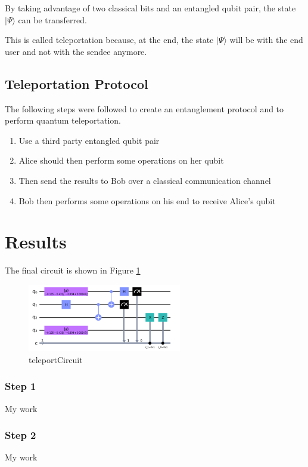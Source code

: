 By taking advantage of two classical bits and an entangled qubit pair, the state $|\Psi \rangle$ can be transferred.

This is called teleportation because, at the end, the state $|\Psi \rangle$ will be with the end user and not with the sendee anymore.

\subsection{Teleportation Protocol}
The following steps were followed to create an entanglement protocol and to perform quantum teleportation.

\begin{enumerate}
    \item Use a third party entangled qubit pair
    \item Alice should then perform some operations on her qubit
    \item Then send the results to Bob over a classical communication channel
    \item Bob then performs some operations on his end to receive Alice’s qubit
\end{enumerate}

\section{Results}

The final circuit is shown in Figure \ref{fig:teleportCircuit}
\begin{figure}[h]
    \centering
    \includegraphics[width=0.6\textwidth]{lab3/images/teleportCircuit.png}
    \caption{teleportCircuit}
    \label{fig:teleportCircuit}
\end{figure}

\subsubsection{Step 1}
My work

\subsubsection{Step 2}
My work

